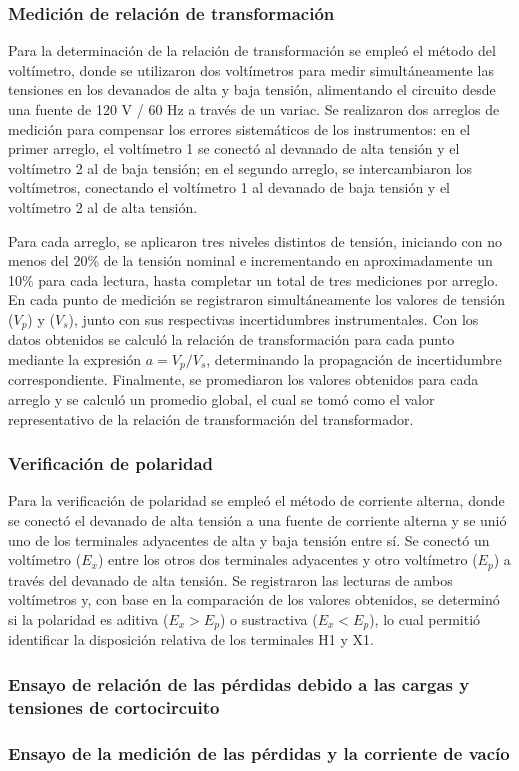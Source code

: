 \subsubsection{Medición de relación de transformación}

Para la determinación de la relación de transformación se empleó el método del voltímetro, donde se utilizaron dos voltímetros para medir simultáneamente las tensiones en los devanados de alta y baja tensión, alimentando el circuito desde una fuente de 120 V / 60 Hz a través de un variac. Se realizaron dos arreglos de medición para compensar los errores sistemáticos de los instrumentos: en el primer arreglo, el voltímetro 1 se conectó al devanado de alta tensión y el voltímetro 2 al de baja tensión; en el segundo arreglo, se intercambiaron los voltímetros, conectando el voltímetro 1 al devanado de baja tensión y el voltímetro 2 al de alta tensión. 

Para cada arreglo, se aplicaron tres niveles distintos de tensión, iniciando con no menos del 20\% de la tensión nominal e incrementando en aproximadamente un 10\% para cada lectura, hasta completar un total de tres mediciones por arreglo. En cada punto de medición se registraron simultáneamente los valores de tensión ($V_p$) y ($V_s$), junto con sus respectivas incertidumbres instrumentales. Con los datos obtenidos se calculó la relación de transformación para cada punto mediante la expresión $a = V_p / V_s$, determinando la propagación de incertidumbre correspondiente. Finalmente, se promediaron los valores obtenidos para cada arreglo y se calculó un promedio global, el cual se tomó como el valor representativo de la relación de transformación del transformador.

\subsubsection{Verificación de polaridad}

Para la verificación de polaridad se empleó el método de corriente alterna, donde se conectó el devanado de alta tensión a una fuente de corriente alterna y se unió uno de los terminales adyacentes de alta y baja tensión entre sí. Se conectó un voltímetro ($E_x$) entre los otros dos terminales adyacentes y otro voltímetro ($E_p$) a través del devanado de alta tensión. Se registraron las lecturas de ambos voltímetros y, con base en la comparación de los valores obtenidos, se determinó si la polaridad es aditiva ($E_x > E_p$) o sustractiva ($E_x < E_p$), lo cual permitió identificar la disposición relativa de los terminales H1 y X1.
\subsubsection{Ensayo de relación de las pérdidas debido a las cargas y tensiones de cortocircuito}
\subsubsection{Ensayo de la medición de las pérdidas y la corriente de vacío}


